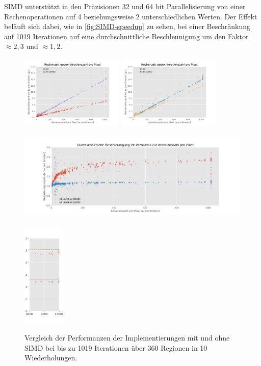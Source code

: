


SIMD unterstützt in den Präzisionen 32 und 64 bit Parallelisierung von einer Rechenoperationen auf
4 beziehungsweise 2 unterschiedlichen Werten. Der Effekt beläuft sich dabei, wie in \autoref{fig:SIMD-speedup} zu sehen,
bei einer Beschränkung auf 1019 Iterationen auf eine durchschnittliche Beschleunigung um den Faktor $\approx2,3$ und $\approx1,2$.

\begin{figure}
	\centering
	\includegraphics[height=3.5cm]{img/Evaluation/simd/itvscmp32.pdf}
	\includegraphics[height=3.5cm]{img/Evaluation/simd/itvscmp64.pdf}
	\includegraphics[height=5cm]{img/Evaluation/simd/speedup.pdf}
	\includegraphics[height=5cm]{img/Evaluation/simd/speedup_10000_crop.pdf}
	\caption{Vergleich der Performanzen der Implementierungen mit und ohne SIMD bei bis zu 1019 Iterationen über 360 Regionen in 10 Wiederholungen.}
	\label{fig:SIMD-speedup}
	\label{fig:SIMD-speedup-vs-comptime}
\end{figure}

